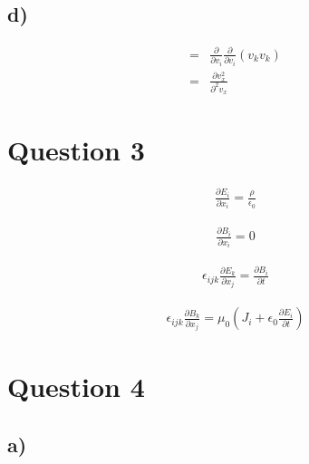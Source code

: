 \documentclass[paper=a4, fontsize=12pt]{scrartcl}
\begin{document}
\subsection*{d)}
\begin{align*}
=&
\frac{\partial}{\partial v_i} \frac{\partial}{\partial v_i}(v_k v_k)\\
=& \frac{\partial v^2_x}{\partial ^2 v_x}
\end{align*}	

\section*{Question 3}
\begin{align*}
\frac{\partial E_i}{\partial x_i} = \frac{\rho}{\epsilon_0}
\end{align*}

\begin{align*}
\frac{\partial B_i}{\partial x_i} = 0
\end{align*}

\begin{align*}
\epsilon_{ijk}\frac{\partial E_k}{\partial x_j} = \frac{\partial B_i}{\partial t}
\end{align*}

\begin{align*}
\epsilon_{ijk}\frac{\partial B_k}{\partial x_j} = \mu_0(J_i + \epsilon_0 \frac{\partial E_i}{\partial t})
\end{align*}
	
\section*{Question 4}
\subsection*{a)}
	
\end{document}
